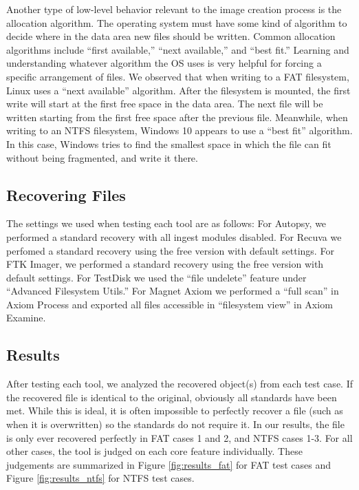 Another type of low-level behavior relevant to the image creation process is the allocation algorithm. The operating system must have some kind of algorithm to decide where in the data area new files should be written. Common allocation algorithms include ``first available,'' ``next available,'' and ``best fit.'' %
Learning and understanding whatever algorithm the OS uses is very helpful for forcing a specific arrangement of files. We observed that when writing to a FAT filesystem, Linux uses a ``next available'' algorithm. After the filesystem is mounted, the first write will start at the first free space in the data area. The next file will be written starting from the first free space after the previous file.
Meanwhile, when writing to an NTFS filesystem, Windows 10 appears to use a ``best fit'' algorithm. In this case, Windows tries to find the smallest space in which the file can fit without being fragmented, and write it there.


\subsection{Recovering Files}

The settings we used when testing each tool are as follows:
For Autopsy, we performed a standard recovery with all ingest modules disabled.
For Recuva we perfomed a standard recovery using the free version with default settings.
For FTK Imager, we performed a standard recovery using the free version with default settings.
For TestDisk we used the ``file undelete'' feature under ``Advanced Filesystem Utils.''
For Magnet Axiom we performed a ``full scan'' in Axiom Process and exported all files accessible in ``filesystem view'' in Axiom Examine.

\subsection{Results}

After testing each tool, we analyzed the recovered object(s) from each test case. 
If the recovered file is identical to the original, obviously all standards have been met. 
While this is ideal, it is often impossible to perfectly recover a file (such as when it is overwritten) so the standards do not require it. 
In our results, the file is only ever recovered perfectly in FAT cases 1 and 2, and NTFS cases 1-3. 
For all other cases, the tool is judged on each core feature individually. 
These judgements are summarized in Figure \ref{fig:results_fat} for FAT test cases and Figure \ref{fig:results_ntfs} for NTFS test cases.

